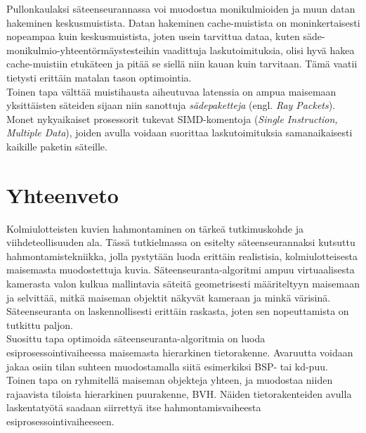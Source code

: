\documentclass[a4paper, 12pt, titlepage]{article}
\begin{document}
Pullonkaulaksi säteenseurannassa voi muodostua monikulmioiden ja muun datan hakeminen keskusmuistista. Datan hakeminen cache-muistista on moninkertaisesti nopeampaa kuin keskusmuistista, joten usein tarvittua dataa, kuten säde-monikulmio-yhteentörmäystesteihin vaadittuja laskutoimituksia, olisi hyvä hakea cache-muistiin etukäteen ja pitää se siellä niin kauan kuin tarvitaan. Tämä vaatii tietysti erittäin matalan tason optimointia. \citep[.]{wald01}\\

Toinen tapa välttää muistihausta aiheutuvaa latenssia on ampua maisemaan yksittäisten säteiden sijaan niin sanottuja \emph{sädepaketteja} (engl. \emph{Ray Packets}). Monet nykyaikaiset prosessorit tukevat SIMD-komentoja (\emph{Single Instruction, Multiple Data}), joiden avulla voidaan suorittaa laskutoimituksia samanaikaisesti kaikille paketin säteille. \citep[.]{wald01}\\

 



\newpage
\section{Yhteenveto}

Kolmiulotteisten kuvien hahmontaminen on tärkeä tutkimuskohde ja viihdeteollisuuden ala. Tässä tutkielmassa on esitelty säteenseurannaksi kutsuttu hahmontamistekniikka, jolla pystytään luoda erittäin realistisia, kolmiulotteisesta maisemasta muodostettuja kuvia. Säteenseuranta-algoritmi ampuu virtuaalisesta kamerasta valon kulkua mallintavia säteitä geometrisesti määriteltyyn maisemaan ja selvittää, mitkä maiseman objektit näkyvät kameraan ja minkä värisinä. Säteenseuranta on laskennollisesti erittäin raskasta, joten sen nopeuttamista on tutkittu paljon.    \\

Suosittu tapa optimoida säteenseuranta-algoritmia on luoda esiprosessointivaiheessa maisemasta hierarkinen tietorakenne. Avaruutta voidaan jakaa osiin tilan suhteen muodostamalla siitä esimerkiksi BSP- tai kd-puu. Toinen tapa on ryhmitellä maiseman objekteja yhteen, ja muodostaa niiden rajaavista tiloista hierarkinen puurakenne, BVH. Näiden tietorakenteiden avulla laskentatyötä saadaan siirrettyä itse hahmontamisvaiheesta esiprosessointivaiheeseen.\\
\end{document}
